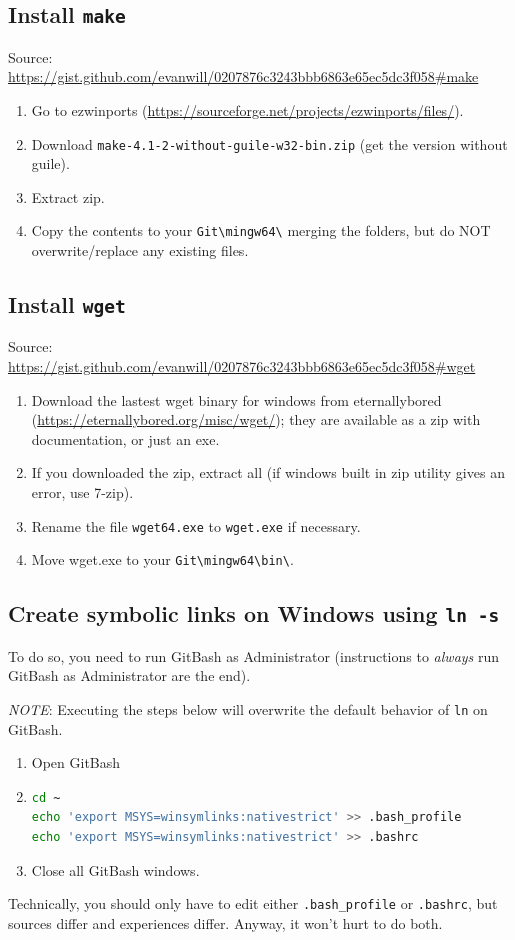 \subsection{Install \texttt{make}}
Source: \url{https://gist.github.com/evanwill/0207876c3243bbb6863e65ec5dc3f058#make}
\begin{enumerate}
    \item Go to ezwinports (\url{https://sourceforge.net/projects/ezwinports/files/}).
    \item Download \texttt{make-4.1-2-without-guile-w32-bin.zip} (get the version without guile).
    \item Extract zip.
    \item Copy the contents to your \texttt{Git{\textbackslash}mingw64{\textbackslash}} merging the folders,
        but do NOT overwrite/replace any existing files.
\end{enumerate}

\subsection{Install \texttt{wget}}
Source: \url{https://gist.github.com/evanwill/0207876c3243bbb6863e65ec5dc3f058#wget}
\begin{enumerate}
    \item Download the lastest wget binary for windows from eternallybored
        (\url{https://eternallybored.org/misc/wget/});
        they are available as a zip with documentation, or just an exe.
    \item If you downloaded the zip, extract all (if windows built in zip utility gives an error, use 7-zip).
    \item Rename the file \texttt{wget64.exe} to \texttt{wget.exe} if necessary.
    \item Move wget.exe to your \texttt{Git{\textbackslash}mingw64{\textbackslash}bin{\textbackslash}}.
\end{enumerate}

\subsection{Create symbolic links on Windows using \texttt{ln -s}}
To do so, you need to run GitBash as Administrator
    (instructions to \textit{always} run GitBash as Administrator are the end).

\noindent \textit{NOTE}: 
Executing the steps below will overwrite
the default behavior of \texttt{ln} on GitBash.
\begin{enumerate}
\item Open GitBash
\item
\begin{lstlisting}[language=bash]
cd ~
echo 'export MSYS=winsymlinks:nativestrict' >> .bash_profile
echo 'export MSYS=winsymlinks:nativestrict' >> .bashrc
\end{lstlisting}
\item Close all GitBash windows.
\end{enumerate}
Technically, you should only have to edit either
\texttt{.bash\_profile} or \texttt{.bashrc},
but sources differ and experiences differ.
Anyway, it won't hurt to do both.

